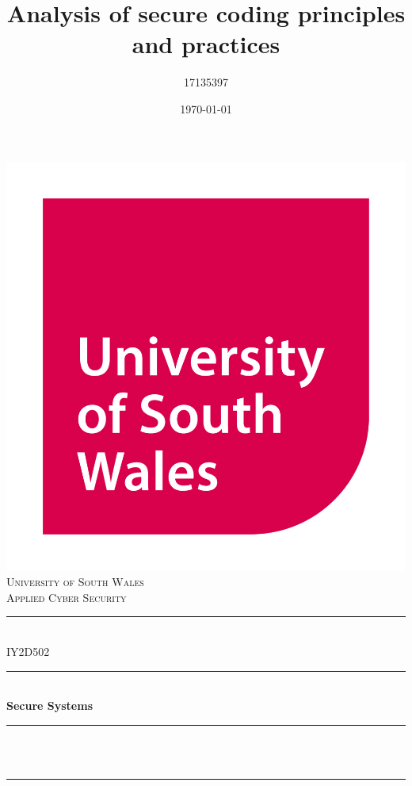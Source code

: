 \documentclass[12pt]{article}
\title{Analysis of secure coding principles and practices}
\author{17135397}
\date{\today}
\makeatletter
\let\thetitle\@title
\let\thedate\@date
\makeatother
\begin{document}
\begin{titlepage}
  \centering
  \includegraphics[scale = 0.15]{usw_logo.jpg}\\
  \textsc{\LARGE University of South Wales\\\Large Applied Cyber Security}\\[2cm]

  \rule{\linewidth}{0.2 mm}\\[0.5cm]
  { \huge IY2D502}\\
  \rule{\linewidth}{0.2 mm}\\[0.5cm]
  { \huge \bfseries Secure Systems}\\
  \rule{\linewidth}{0.2 mm}\\[0.5cm]
  \textsc{\Large \thetitle}\\
  \rule{\linewidth}{0.2 mm}\\[2cm]

  { \large \textit{\thedate}}\\[2cm]


\end{titlepage}
\end{document}
